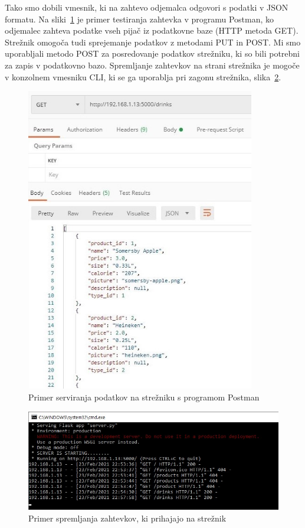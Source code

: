\documentclass[a4paper, 12pt]{book}
\begin{document}
Tako smo dobili vmesnik, ki na zahtevo odjemalca odgovori s podatki v JSON formatu. Na sliki~\ref{ServerEX} je primer testiranja zahtevka v programu Postman, ko odjemalec zahteva podatke vseh pijač iz podatkovne baze (HTTP metoda GET). Strežnik omogoča tudi sprejemanje podatkov z metodami PUT in POST. Mi smo uporabljali metodo POST za posredovanje podatkov strežniku, ki so bili potrebni za zapis v podatkovno bazo. Spremljanje zahtevkov na strani strežnika je mogoče v konzolnem vmesniku CLI, ki se ga uporablja pri zagonu strežnika, slika~\ref{ServerEX2}.

\begin{figure}[!htb]   
\begin{center}
\includegraphics[width=10cm]{Server_example.jpg}
\caption{Primer serviranja podatkov na strežniku s programom Postman}
\label{ServerEX}
\end{center}
\end{figure}

\begin{figure}[!htb]
\begin{center}
\includegraphics[width=12cm]{Server_example_2.jpg}
\caption{Primer spremljanja zahtevkov, ki prihajajo na strežnik}
\label{ServerEX2}
\end{center}
\end{figure}
\end{document}
